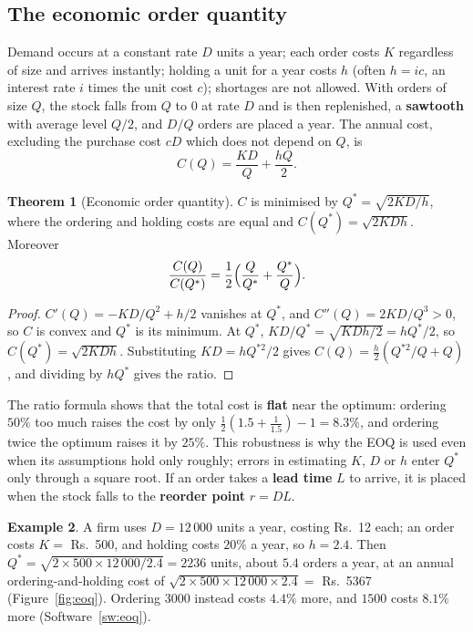 \documentclass[11pt,a4paper]{article}
\numberwithin{equation}{section}
\theoremstyle{definition}
\newtheorem{thm}{Theorem}[subsection]
\newtheorem{exa}[thm]{Example}
\begin{document}
\subsection{The economic order quantity}
\label{ssec:eoq}

Demand occurs at a constant rate $D$ units a year; each order costs $K$ regardless of size and arrives instantly; holding a unit for a year costs $h$ (often $h = ic$, an interest rate $i$ times the unit cost $c$); shortages are not allowed. With orders of size $Q$, the stock falls from $Q$ to $0$ at rate $D$ and is then
replenished, a \textbf{sawtooth} with average level $Q/2$, and $D/Q$ orders are placed a year. The annual cost, excluding the purchase cost $cD$ which does not depend on $Q$, is
\[
C(Q) = \frac{KD}Q + \frac{hQ}2 .
\]

\begin{thm}[Economic order quantity]
\label{thm:eoq}
$C$ is minimised by $Q^* = \sqrt{2KD/h}$, where the ordering and holding costs are equal and $C(Q^*) = \sqrt{2KDh}$. Moreover
\[
\frac{C(Q)}{C(Q^*)} = \frac12\Bigl(\frac Q{Q^*} + \frac{Q^*}Q\Bigr) .
\]
\end{thm}

\begin{proof}
$C'(Q) = -KD/Q^2 + h/2$ vanishes at $Q^*$, and $C''(Q) = 2KD/Q^3 > 0$, so $C$ is convex and $Q^*$ is its minimum. At $Q^*$, $KD/Q^* = \sqrt{KDh/2} = hQ^*/2$, so $C(Q^*) = \sqrt{2KDh}$. Substituting $KD = hQ^{*2}/2$ gives $C(Q) = \frac h2(Q^{*2}/Q + Q)$, and dividing by $hQ^*$ gives the ratio.
\end{proof}

The ratio formula shows that the total cost is \textbf{flat} near the optimum: ordering $50\%$ too much raises the cost by only $\frac12(1.5 + \frac1{1.5}) - 1 = 8.3\%$, and ordering twice the optimum raises it by $25\%$. This robustness is why the EOQ is used even when its assumptions hold only roughly; errors in estimating $K$, $D$ or $h$ enter $Q^*$ only through a
square root. If an order takes a \textbf{lead time} $L$ to arrive, it is placed when the stock falls to the \textbf{reorder point} $r = DL$.

\begin{exa}
\label{ex:eoq}
A firm uses $D = 12\,000$ units a year, costing Rs.~12 each; an order costs $K = $ Rs.~500, and holding costs $20\%$ a year, so $h = 2.4$. Then $Q^* = \sqrt{2 \times 500 \times 12\,000/2.4} = 2236$ units, about $5.4$ orders a year, at an annual ordering-and-holding cost of $\sqrt{2 \times 500 \times 12\,000 \times 2.4} =$ Rs.~5367
(Figure~\ref{fig:eoq}). Ordering $3000$ instead costs $4.4\%$ more, and $1500$ costs $8.1\%$ more (Software~\ref{sw:eoq}).
\end{exa}
\end{document}
